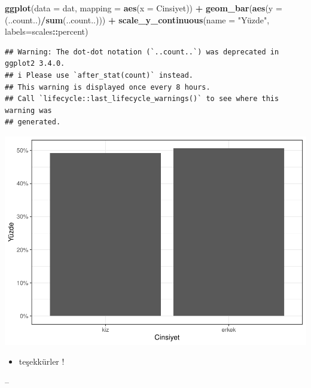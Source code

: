 \documentclass[
  oneside]{book}
\newenvironment{Shaded}{\begin{snugshade}}{\end{snugshade}}
\newcommand{\AttributeTok}[1]{\textcolor[rgb]{0.13,0.29,0.53}{#1}}
\newcommand{\FunctionTok}[1]{\textcolor[rgb]{0.13,0.29,0.53}{\textbf{#1}}}
\newcommand{\NormalTok}[1]{#1}
\newcommand{\SpecialCharTok}[1]{\textcolor[rgb]{0.81,0.36,0.00}{\textbf{#1}}}
\newcommand{\StringTok}[1]{\textcolor[rgb]{0.31,0.60,0.02}{#1}}
\providecommand{\tightlist}{%
  \setlength{\itemsep}{0pt}\setlength{\parskip}{0pt}}
\begin{document}
\begin{Shaded}
\begin{Highlighting}[]
\FunctionTok{ggplot}\NormalTok{(}\AttributeTok{data =}\NormalTok{ dat, }\AttributeTok{mapping =} \FunctionTok{aes}\NormalTok{(}\AttributeTok{x =}\NormalTok{ Cinsiyet)) }\SpecialCharTok{+} 
  \FunctionTok{geom\_bar}\NormalTok{(}\FunctionTok{aes}\NormalTok{(}\AttributeTok{y =}\NormalTok{ (..count..)}\SpecialCharTok{/}\FunctionTok{sum}\NormalTok{(..count..))) }\SpecialCharTok{+} 
  \FunctionTok{scale\_y\_continuous}\NormalTok{(}\AttributeTok{name =} \StringTok{"Yüzde"}\NormalTok{, }\AttributeTok{labels=}\NormalTok{scales}\SpecialCharTok{::}\NormalTok{percent) }
\end{Highlighting}
\end{Shaded}

\begin{verbatim}
## Warning: The dot-dot notation (`..count..`) was deprecated in ggplot2 3.4.0.
## i Please use `after_stat(count)` instead.
## This warning is displayed once every 8 hours.
## Call `lifecycle::last_lifecycle_warnings()` to see where this warning was
## generated.
\end{verbatim}

\begin{center}\includegraphics[width=1\linewidth]{15-betimleyici-istatistik_files/figure-latex/unnamed-chunk-60-1} \end{center}

\begin{itemize}
\tightlist
\item
  teşekkürler !
\end{itemize}

--
\end{document}
